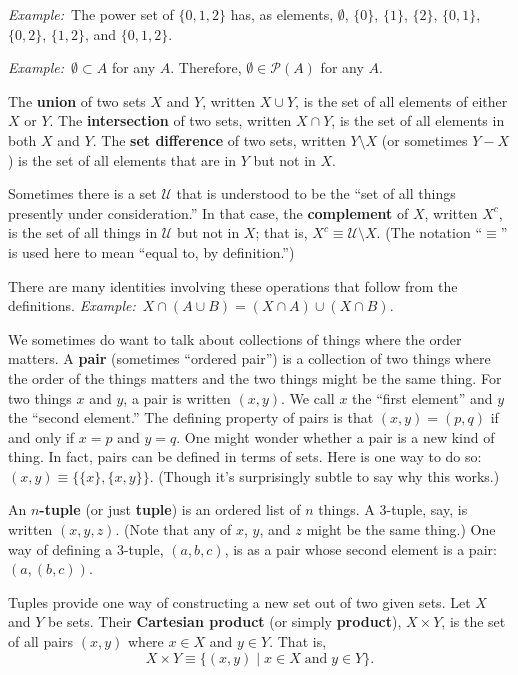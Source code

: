 \documentclass[12pt, a4paper]{article}
\newcommand{\defn}[1]{\textbf{#1}}
\newcommand{\eg}{\emph{Example:}\relax}
\begin{document}
\eg\ The power set of $\{0,1,2\}$ has, as elements, $\emptyset$, $\{0\}$,
$\{1\}$, $\{2\}$, $\{0,1\}$, $\{0,2\}$, $\{1,2\}$, and $\{0,1,2\}$.

\eg\ $\emptyset \subset A$ for any $A$. Therefore, $\emptyset \in \mathcal{P}(A)$ for any $A$. 

The \defn{union} of two sets $X$ and $Y$, written $X \cup Y$, is the set
of all elements of either $X$ or $Y$. The \defn{intersection} of two
sets, written $X \cap Y$, is the set of all elements in both $X$ and
$Y$. The \defn{set difference} of two sets, written $Y \setminus X$ (or
sometimes $Y-X$) is the set of all elements that are in $Y$ but not in
$X$.

Sometimes there is a set $\mathcal{U}$ that is understood to be the “set of all
things presently under consideration.” In that case, the
\defn{complement} of $X$, written $X^c$, is the set of all things in
$\mathcal{U}$ but not in $X$; that is, $X^c \equiv \mathcal{U} \setminus X$. (The notation “$\equiv$” is
used here to mean “equal to, by definition.”)

There are many identities involving these operations that follow from
the definitions.
\eg\ $X\cap(A\cup B) = (X\cap A) \cup (X\cap B)$.

We sometimes do want to talk about collections of things where the
order matters. A \defn{pair} (sometimes “ordered pair”) is a
collection of two things where the order of the things matters and the
two things might be the same thing. For two things $x$ and $y$, a pair
is written $(x, y)$. We call $x$ the “first element” and $y$ the
“second element.” The defining property of pairs is that $(x,y)=(p,q)$
if and only if $x=p$ and $y=q$. One might wonder whether a pair is a
new kind of thing. In fact, pairs can be defined in terms of
sets. Here is one way to do so: $(x, y)\equiv \{\{x\}, \{x,y\}\}$. (Though
it's surprisingly subtle to say why this works.)

An \defn{$n$-tuple} (or just \defn{tuple}) is an ordered list of $n$
things. A 3-tuple, say, is written $(x, y, z)$. (Note that any of $x$,
$y$, and $z$ might be the same thing.) One way of defining a 3-tuple,
$(a, b, c)$, is as a pair whose second element is a pair: $(a, (b,
c))$.
  
Tuples provide one way of constructing a new set out of two given
sets. Let $X$ and $Y$ be sets. Their \defn{Cartesian product} (or
simply \defn{product}), $X \times Y$, is the set of all pairs $(x, y)$
where $x \in X$ and $y \in Y$. That is,
\begin{equation*}
X\times Y\equiv \{(x, y) \mid x\in X\;\text{and}\; y\in Y\}.
\end{equation*}
\end{document}

